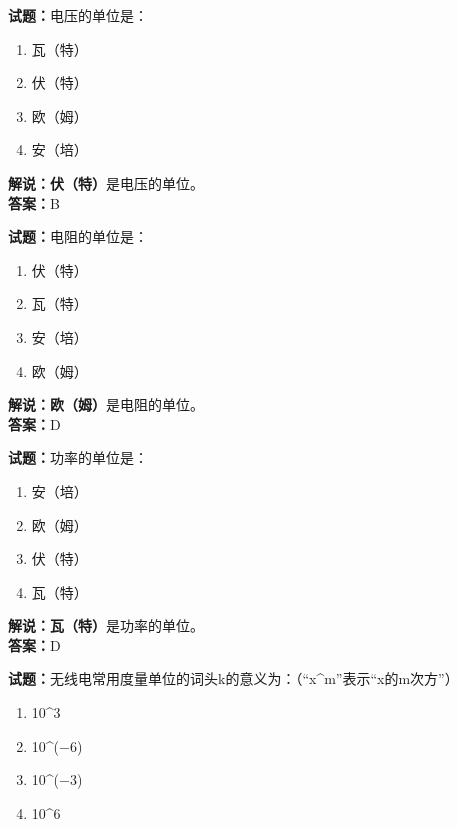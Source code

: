 \documentclass{ctexbook}
\begin{document}
\bigskip


\noindent\textbf{试题：}电压的单位是：

\begin{enumerate}[leftmargin=3em]
	\item 瓦（特）
	\item 伏（特）
	\item 欧（姆）
	\item 安（培）
\end{enumerate}

\noindent\textbf{解说：伏（特）}是电压的单位。\cite[137-138]{si}\\
\noindent\textbf{答案：}B


\bigskip


\noindent\textbf{试题：}电阻的单位是：

\begin{enumerate}[leftmargin=3em]
	\item 伏（特）
	\item 瓦（特）
	\item 安（培）
	\item 欧（姆）
\end{enumerate}

\noindent\textbf{解说：欧（姆）}是电阻的单位。\cite[137-138]{si}\\
\noindent\textbf{答案：}D


\bigskip


\noindent\textbf{试题：}功率的单位是：

\begin{enumerate}[leftmargin=3em]
	\item 安（培）
	\item 欧（姆）
	\item 伏（特）
	\item 瓦（特）
\end{enumerate}

\noindent\textbf{解说：瓦（特）}是功率的单位。\cite[137-138]{si}\\
\noindent\textbf{答案：}D


\bigskip


\noindent\textbf{试题：}无线电常用度量单位的词头k的意义为：（“x\string^m”表示“x的m次方”）

\begin{enumerate}[leftmargin=3em]
	\item \num{10}\string^\num{3}
	\item \num{10}\string^(\num{-6})
	\item \num{10}\string^(\num{-3})
	\item \num{10}\string^\num{6}
\end{enumerate}
\end{document}
